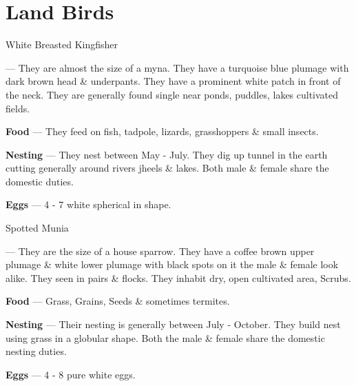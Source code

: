 \part{Land Birds}

\begin{bird}{White Breasted Kingfisher}

 --- They are almost the size of a myna. They have a turquoise blue plumage with dark brown head \& underpants. They  have a prominent white patch in front of the neck. They are generally found single near ponds, puddles, lakes cultivated fields.

{\large\bf Food} --- They feed on fish, tadpole, lizards, grasshoppers \& small insects.

{\large\bf Nesting} --- They nest between May - July. They dig up tunnel in the earth cutting generally around rivers jheels \& lakes. Both male \& female share the domestic duties.

{\large\bf Eggs} --- 4 - 7 white spherical in shape.
\end{bird}

\begin{bird}{Spotted Munia}

 --- They are the size of a house sparrow. They have a coffee brown upper plumage \& white lower plumage with black spots on it the male \& female look alike. They seen in pairs \& flocks. They inhabit dry, open cultivated area, Scrubs. 

{\large\bf Food} --- Grass, Grains, Seeds \& sometimes termites.

{\large\bf Nesting} --- Their nesting is generally between July - October. They build nest using grass in a globular shape. Both the male \& female share the domestic nesting duties.

{\large\bf Eggs} --- 4 - 8 pure white eggs.
\end{bird}

